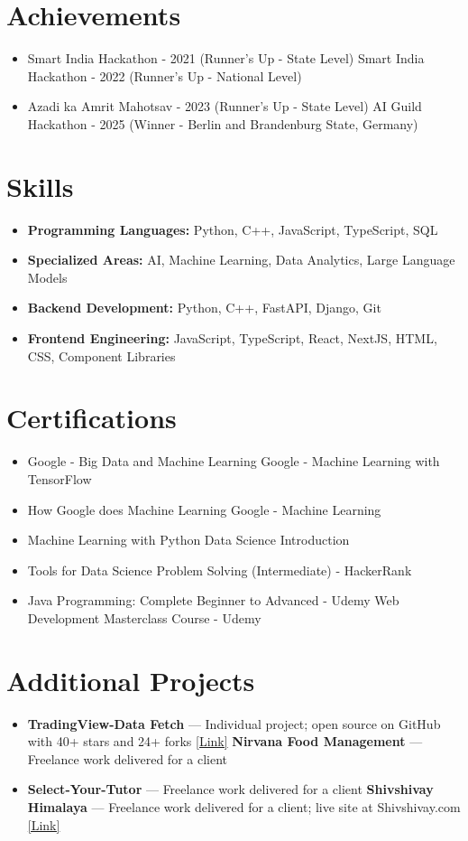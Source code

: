 \documentclass[a4paper,10pt]{article}
\begin{document}
\section*{Achievements}
\begin{itemize}
\item Smart India Hackathon - 2021 (Runner's Up - State Level) \hfill Smart India Hackathon - 2022 (Runner's Up - National Level)
\item Azadi ka Amrit Mahotsav - 2023 (Runner's Up - State Level) \hfill AI Guild Hackathon - 2025 (Winner - Berlin and Brandenburg State, Germany)
\end{itemize}

\section*{Skills}
\begin{itemize}
  \item \textbf{Programming Languages:} Python, C++, JavaScript, TypeScript, SQL
  \item \textbf{Specialized Areas:} AI, Machine Learning, Data Analytics, Large Language Models
  \item \textbf{Backend Development:} Python, C++, FastAPI, Django, Git
  \item \textbf{Frontend Engineering:} JavaScript, TypeScript, React, NextJS, HTML, CSS, Component Libraries
\end{itemize}

\section*{Certifications}
\begin{itemize}
\item Google - Big Data and Machine Learning \hfill Google - Machine Learning with TensorFlow
\item How Google does Machine Learning \hfill Google - Machine Learning
\item Machine Learning with Python \hfill Data Science Introduction
\item Tools for Data Science \hfill Problem Solving (Intermediate) - HackerRank
\item Java Programming: Complete Beginner to Advanced - Udemy \hfill Web Development Masterclass Course - Udemy
\end{itemize}

\section*{Additional Projects}
\begin{itemize}
\item \textbf{TradingView-Data Fetch} — Individual project; open source on GitHub with 40+ stars and 24+ forks \href{https://github.com/ravalmeet/TradingView}{[Link]} \hfill \textbf{Nirvana Food Management} — Freelance work delivered for a client
\item \textbf{Select-Your-Tutor} — Freelance work delivered for a client \hfill \textbf{Shivshivay Himalaya} — Freelance work delivered for a client; live site at Shivshivay.com \href{Shivshivay.com}{[Link]}
\end{itemize}
\end{document}
